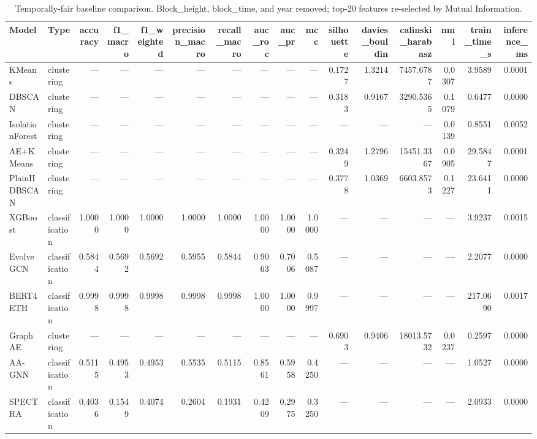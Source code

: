 \begin{table}[!t]
\centering
\caption{Temporally-fair baseline comparison. Block\_height, block\_time, and year removed; top-20 features re-selected by Mutual Information.}
\label{tab:fair_baselines}
\renewcommand{\arraystretch}{1.1}
\begin{tabular}{llrrrrrrrrrrrrrr}
\toprule
Model & Type & accuracy & f1_macro & f1_weighted & precision_macro & recall_macro & auc_roc & auc_pr & mcc & silhouette & davies_bouldin & calinski_harabasz & nmi & train_time_s & inference_ms \\
\midrule
KMeans & clustering & --- & --- & --- & --- & --- & --- & --- & --- & 0.1727 & 1.3214 & 7457.6787 & 0.0307 & 3.9589 & 0.0001 \\
DBSCAN & clustering & --- & --- & --- & --- & --- & --- & --- & --- & 0.3183 & 0.9167 & 3290.5365 & 0.1079 & 0.6477 & 0.0000 \\
IsolationForest & clustering & --- & --- & --- & --- & --- & --- & --- & --- & --- & --- & --- & 0.0139 & 0.8551 & 0.0052 \\
AE+KMeans & clustering & --- & --- & --- & --- & --- & --- & --- & --- & 0.3249 & 1.2796 & 15451.3367 & 0.0905 & 29.5847 & 0.0001 \\
PlainHDBSCAN & clustering & --- & --- & --- & --- & --- & --- & --- & --- & 0.3778 & 1.0369 & 6603.8573 & 0.1227 & 23.6411 & 0.0000 \\
XGBoost & classification & 1.0000 & 1.0000 & 1.0000 & 1.0000 & 1.0000 & 1.0000 & 1.0000 & 1.0000 & --- & --- & --- & --- & 3.9237 & 0.0015 \\
EvolveGCN & classification & 0.5844 & 0.5692 & 0.5692 & 0.5955 & 0.5844 & 0.9063 & 0.7006 & 0.5087 & --- & --- & --- & --- & 2.2077 & 0.0000 \\
BERT4ETH & classification & 0.9998 & 0.9998 & 0.9998 & 0.9998 & 0.9998 & 1.0000 & 1.0000 & 0.9997 & --- & --- & --- & --- & 217.0690 & 0.0017 \\
GraphAE & clustering & --- & --- & --- & --- & --- & --- & --- & --- & 0.6903 & 0.9406 & 18013.5732 & 0.0237 & 0.2597 & 0.0000 \\
AA-GNN & classification & 0.5115 & 0.4953 & 0.4953 & 0.5535 & 0.5115 & 0.8561 & 0.5958 & 0.4250 & --- & --- & --- & --- & 1.0527 & 0.0000 \\
SPECTRA & classification & 0.4036 & 0.1549 & 0.4074 & 0.2604 & 0.1931 & 0.4209 & 0.2975 & 0.3250 & --- & --- & --- & --- & 2.0933 & 0.0000 \\
\bottomrule
\end{tabular}
\end{table}